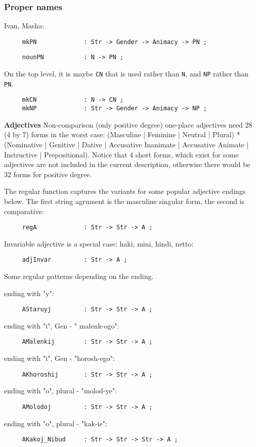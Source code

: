 \subsubsection{Proper names}

{\cyr Ivan, Masha}:
\begin{verbatim}
     mkPN             : Str -> Gender -> Animacy -> PN ;
\end{verbatim}
\begin{verbatim}
     nounPN           : N -> PN ;
\end{verbatim}

On the top level, it is maybe {\tt CN} that is used rather than {\tt N}, and
{\tt NP} rather than {\tt PN}.
\begin{verbatim}
     mkCN             : N -> CN ;
     mkNP             : Str -> Gender -> Animacy -> NP ;
\end{verbatim}

\textbf{Adjectives}
Non-comparison (only positive degree) one-place adjectives need 28
(4 by 7) forms in the worst case: (Masculine  | Feminine | Neutral
| Plural) * (Nominative | Genitive | Dative | Accusative Inanimate
| Accusative Animate | Instructive | Prepositional). Notice that 4
short forms, which exist for some adjectives are not included in
the current description, otherwise there would be 32 forms for
positive degree.

The regular function captures the variants for some popular
adjective endings below. The first string agrument is the
masculine singular form, the second is comparative:
\begin{verbatim}
     regA             : Str -> Str -> A ;
\end{verbatim}

\noindent Invariable adjective is a special case: {\cyr haki,
mini, hindi, netto}:
\begin{verbatim}
     adjInvar         : Str -> A ;
\end{verbatim}

Some regular patterns depending on the ending.

\noindent ending with "{\cyr y\cyrishrt{}}":
\begin{verbatim}
     AStaruyj         : Str -> Str -> A ;
\end{verbatim}
ending with "{\cyr i\cyrishrt{}}", Gen - "{\cyr
malen\cyrsftsn{}k-ogo}":
\begin{verbatim}
     AMalenkij        : Str -> Str -> A ;
\end{verbatim}
ending with "{\cyr i\cyrishrt{}}", Gen - "{\cyr horosh-ego}":
\begin{verbatim}
     AKhoroshij       : Str -> Str -> A ;
\end{verbatim}
ending with "{\cyr o\cyrishrt{}}", plural - "{\cyr molod-ye}":
\begin{verbatim}
     AMolodoj         : Str -> Str -> A ;
\end{verbatim}
ending with "{\cyr o\cyrishrt{}}", plural - "{\cyr kak-ie}":
\begin{verbatim}
     AKakoj_Nibud     : Str -> Str -> Str -> A ;
\end{verbatim}

